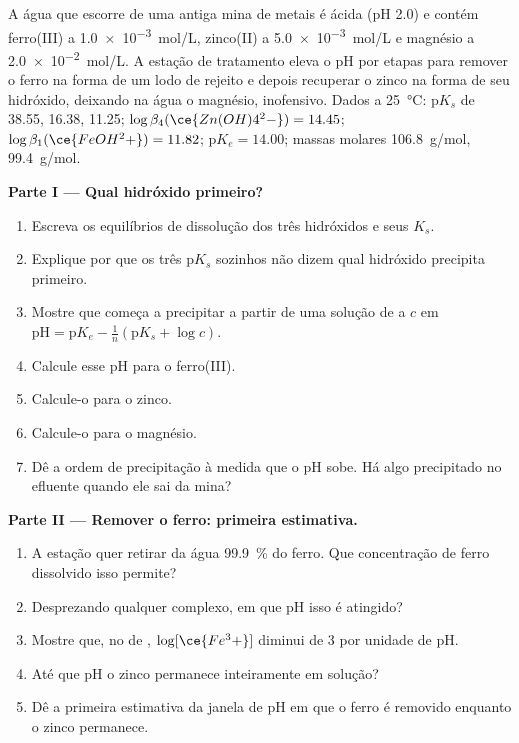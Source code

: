 \begin{problem}
\label{pb:b1:precipitation:1}
A água que escorre de uma antiga mina de metais é ácida (pH 2.0) e
contém ferro(III) a \qty{1.0e-3}{mol/L}, zinco(II) a \qty{5.0e-3}{mol/L}
e magnésio a \qty{2.0e-2}{mol/L}. A estação de tratamento eleva o pH por
etapas para remover o ferro na forma de um lodo de rejeito e depois
recuperar o zinco na forma de seu hidróxido, deixando na água o
magnésio, inofensivo. Dados a \qty{25}{\celsius}: $\mathrm{p}K_s$ de
 38.55,  16.38,  11.25;
$\log\beta_4(\ce{Zn(OH)4^2-}) = 14.45$;
$\log\beta_1(\ce{FeOH^2+}) = 11.82$; $\mathrm{p}K_e = 14.00$; massas molares
 \qty{106.8}{g/mol},  \qty{99.4}{g/mol}.

\medskip
\noindent\textbf{Parte I --- Qual hidróxido primeiro?}
\begin{enumerate}
  \item Escreva os equilíbrios de dissolução dos três hidróxidos e seus
        $K_s$.
  \item Explique por que os três $\mathrm{p}K_s$ sozinhos não dizem qual
        hidróxido precipita primeiro.
  \item Mostre que  começa a precipitar a partir de uma
        solução de  a $c$ em $\mathrm{pH} = \mathrm{p}K_e -
        \frac1n(\mathrm{p}K_s + \log c)$.
  \item Calcule esse pH para o ferro(III).
  \item Calcule-o para o zinco.
  \item Calcule-o para o magnésio.
  \item Dê a ordem de precipitação à medida que o pH sobe. Há algo
        precipitado no efluente quando ele sai da mina?
\end{enumerate}

\medskip
\noindent\textbf{Parte II --- Remover o ferro: primeira estimativa.}
\begin{enumerate}[resume]
  \item A estação quer retirar da água \qty{99.9}{\percent} do ferro. Que
        concentração de ferro dissolvido isso permite?
  \item Desprezando qualquer complexo, em que pH isso é atingido?
  \item Mostre que, no  de ,
        $\log[\ce{Fe^3+}]$ diminui de 3 por unidade de pH.
  \item Até que pH o zinco permanece inteiramente em solução?
  \item Dê a primeira estimativa da janela de pH em que o ferro é
        removido enquanto o zinco permanece.
\end{enumerate}


\end{problem}
